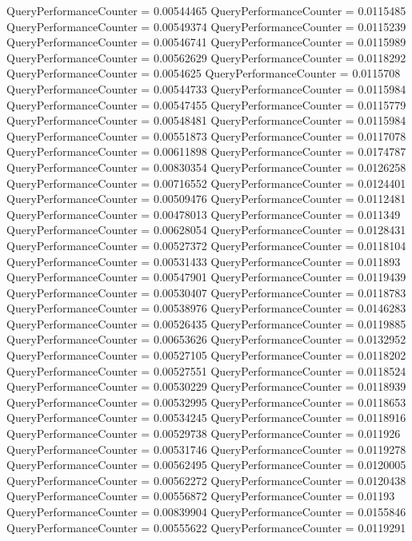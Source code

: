 \documentclass[9pt]{article}
\theoremstyle{plain}
\theoremstyle{definition}
\theoremstyle{remark}
\numberwithin{equation}{section}
\begin{document}
QueryPerformanceCounter  =  0.00544465
QueryPerformanceCounter  =  0.0115485
QueryPerformanceCounter  =  0.00549374
QueryPerformanceCounter  =  0.0115239
QueryPerformanceCounter  =  0.00546741
QueryPerformanceCounter  =  0.0115989
QueryPerformanceCounter  =  0.00562629
QueryPerformanceCounter  =  0.0118292
QueryPerformanceCounter  =  0.0054625
QueryPerformanceCounter  =  0.0115708
QueryPerformanceCounter  =  0.00544733
QueryPerformanceCounter  =  0.0115984
QueryPerformanceCounter  =  0.00547455
QueryPerformanceCounter  =  0.0115779
QueryPerformanceCounter  =  0.00548481
QueryPerformanceCounter  =  0.0115984
QueryPerformanceCounter  =  0.00551873
QueryPerformanceCounter  =  0.0117078
QueryPerformanceCounter  =  0.00611898
QueryPerformanceCounter  =  0.0174787
QueryPerformanceCounter  =  0.00830354
QueryPerformanceCounter  =  0.0126258
QueryPerformanceCounter  =  0.00716552
QueryPerformanceCounter  =  0.0124401
QueryPerformanceCounter  =  0.00509476
QueryPerformanceCounter  =  0.0112481
QueryPerformanceCounter  =  0.00478013
QueryPerformanceCounter  =  0.011349
QueryPerformanceCounter  =  0.00628054
QueryPerformanceCounter  =  0.0128431
QueryPerformanceCounter  =  0.00527372
QueryPerformanceCounter  =  0.0118104
QueryPerformanceCounter  =  0.00531433
QueryPerformanceCounter  =  0.011893
QueryPerformanceCounter  =  0.00547901
QueryPerformanceCounter  =  0.0119439
QueryPerformanceCounter  =  0.00530407
QueryPerformanceCounter  =  0.0118783
QueryPerformanceCounter  =  0.00538976
QueryPerformanceCounter  =  0.0146283
QueryPerformanceCounter  =  0.00526435
QueryPerformanceCounter  =  0.0119885
QueryPerformanceCounter  =  0.00653626
QueryPerformanceCounter  =  0.0132952
QueryPerformanceCounter  =  0.00527105
QueryPerformanceCounter  =  0.0118202
QueryPerformanceCounter  =  0.00527551
QueryPerformanceCounter  =  0.0118524
QueryPerformanceCounter  =  0.00530229
QueryPerformanceCounter  =  0.0118939
QueryPerformanceCounter  =  0.00532995
QueryPerformanceCounter  =  0.0118653
QueryPerformanceCounter  =  0.00534245
QueryPerformanceCounter  =  0.0118916
QueryPerformanceCounter  =  0.00529738
QueryPerformanceCounter  =  0.011926
QueryPerformanceCounter  =  0.00531746
QueryPerformanceCounter  =  0.0119278
QueryPerformanceCounter  =  0.00562495
QueryPerformanceCounter  =  0.0120005
QueryPerformanceCounter  =  0.00562272
QueryPerformanceCounter  =  0.0120438
QueryPerformanceCounter  =  0.00556872
QueryPerformanceCounter  =  0.01193
QueryPerformanceCounter  =  0.00839904
QueryPerformanceCounter  =  0.0155846
QueryPerformanceCounter  =  0.00555622
QueryPerformanceCounter  =  0.0119291
\end{document}
